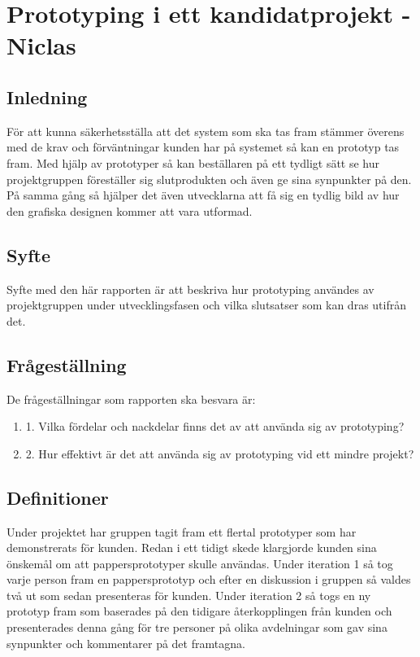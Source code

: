 \chapter{Prototyping i ett kandidatprojekt - Niclas}
\section{Inledning}
För att kunna säkerhetsställa att det system som ska tas fram stämmer överens med de krav och förväntningar kunden har på systemet så kan en prototyp tas fram. Med hjälp av prototyper så kan beställaren på ett tydligt sätt se hur projektgruppen föreställer sig slutprodukten och även ge sina synpunkter på den. På samma gång så hjälper det även utvecklarna att få sig en tydlig bild av hur den grafiska designen kommer att vara utformad. 

\section{Syfte}
Syfte med den här rapporten är att beskriva hur prototyping användes av projektgruppen under utvecklingsfasen och vilka slutsatser som kan dras utifrån det.   

\section{Frågeställning}
De frågeställningar som rapporten ska besvara är:
\begin{enumerate}
	\item 1. Vilka fördelar och nackdelar finns det av att använda sig av prototyping?
	\item 2. Hur effektivt är det att använda sig av prototyping vid ett mindre projekt?
\end{enumerate}

\section{Definitioner}
Under projektet har gruppen tagit fram ett flertal prototyper som har demonstrerats för kunden. Redan i ett tidigt skede klargjorde kunden sina önskemål om att pappersprototyper skulle användas. Under iteration 1 så tog varje person fram en pappersprototyp och efter en diskussion i gruppen så valdes två ut som sedan presenteras för kunden.  Under iteration 2 så togs en ny prototyp fram som baserades på den tidigare återkopplingen från kunden och presenterades denna gång för tre personer på olika avdelningar som gav sina synpunkter och kommentarer på det framtagna.  

